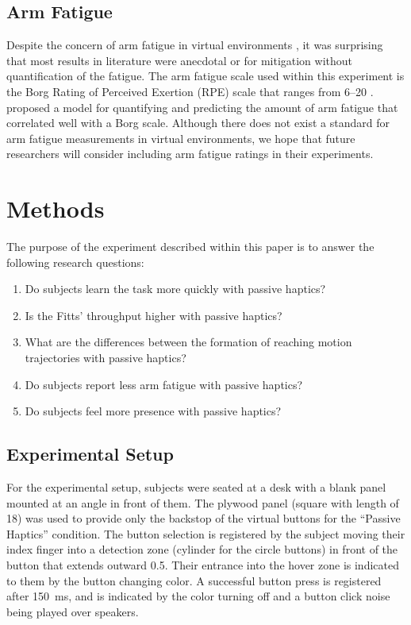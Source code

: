 \subsection{Arm Fatigue}

Despite the concern of arm fatigue in virtual environments \citep{burdea_virtual_2003}, it was surprising that most results in literature were anecdotal or for mitigation without quantification of the fatigue.
The arm fatigue scale used within this experiment is the Borg Rating of Perceived Exertion (RPE) scale that ranges from \numrange{6}{20} \citep{borg_borgs_1998}.
\citet{hincapie-ramos_consumed_2014} proposed a model for quantifying and predicting the amount of arm fatigue that correlated well with a Borg scale.
Although there does not exist a standard for arm fatigue measurements in virtual environments, we hope that future researchers will consider including arm fatigue ratings in their experiments.

\section{Methods}

The purpose of the experiment described within this paper is to answer the following research questions:

\begin{enumerate}
    \item Do subjects learn the task more quickly with passive haptics?
    \item Is the Fitts' throughput higher with passive haptics?
    \item What are the differences between the formation of reaching motion trajectories with passive haptics?
    \item Do subjects report less arm fatigue with passive haptics?
    \item Do subjects feel more presence with passive haptics?
\end{enumerate}

\subsection{Experimental Setup}

For the experimental setup, subjects were seated at a desk with a blank panel mounted at an angle in front of them.
The plywood panel (square with length of \SI{18}{\inch}) was used to provide only the backstop of the virtual buttons for the ``Passive Haptics'' condition.
The button selection is registered by the subject moving their index finger into a detection zone (cylinder for the circle buttons) in front of the button that extends outward \SI{0.5}{\inch}.
Their entrance into the hover zone is indicated to them by the button changing color.
A successful button press is registered after \SI{150}{\milli\second}, and is indicated by the color turning off and a button click noise being played over speakers.

